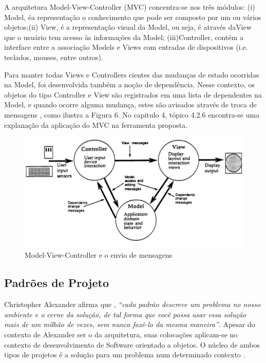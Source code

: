 A arquitetura Model-View-Controller (MVC) concentra-se nos três módulos: (i) Model, éa representação o conhecimento que pode ser composto por um ou vários objetos;(ii) View, é a representação visual da Model, ou seja, é através daView que o usuário tem acesso às informações da Model; (iii)Controller, contém a interface entre a associação Models e Views com entradas de dispositivos (i.e. teclados, mouses, entre outros)\cite[p. 2]{krasner1988}.

Para manter todas Views e Controllers cientes das mudanças de estado ocorridas na Model, foi desenvolvida também a noção de dependência. Nesse contexto, os objetos do tipo Controller e View são registrados em uma lista de dependentes na Model, e quando ocorre alguma mudança, estes são avisados através de troca de mensagens \cite[p. 2]{krasner1988}, como ilustra a Figura 6. No capitulo 4, tópico 4.2.6 encontra-se uma explanação da aplicação do MVC na ferramenta proposta.

\begin{figure}[h]
\centering
\label{f06}
\includegraphics[width=1\textwidth]{figuras/f06}
\caption{Model-View-Controller e o envio de mensagens}

\end{figure}



\subsection{Padrões de Projeto}

Christopher Alexander afirma que , \textit{“cada padrão descreve um problema no nosso ambiente e o cerne da solução, de tal forma que você possa usar essa solução mais de um milhão de vezes, sem nunca fazê-lo da mesma maneira”}. Apesar do contexto de Alexander ser o da arquitetura, suas colocações aplicam-se no contexto de desenvolvimento de Software orientado a objetos. O núcleo de ambos tipos de projetos é a solução para um problema num determinado contexto \cite[p.19]{gamma2000}.

